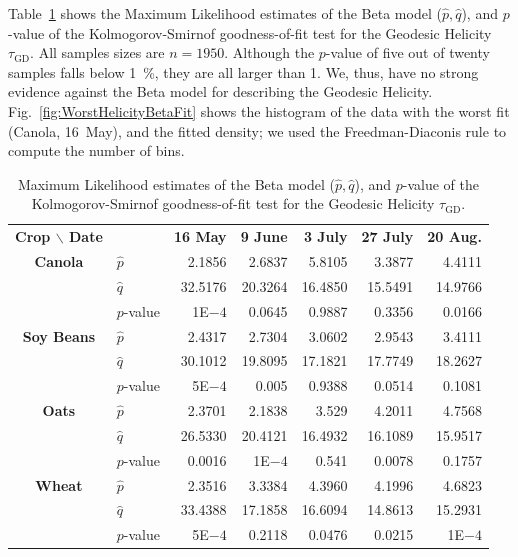 \documentclass[journal]{IEEEtran}
\begin{document}
Table~\ref{tab:params_helicity} shows the Maximum Likelihood estimates of the Beta model ($\widehat p,\widehat q$), and $p$-value of the Kolmogorov-Smirnof goodness-of-fit test for the Geodesic Helicity $\tau_{\text{GD}}$.
All samples sizes are $n=1950$.
Although the $p$-value of five out of twenty samples falls below \SI{1}{\percent}, they are all larger than \SI{1}{\pertenmille}.
We, thus, have no strong evidence against the Beta model for describing the Geodesic Helicity.
Fig.~\ref{fig:WorstHelicityBetaFit} shows the histogram of the data with the worst fit (Canola, 16~May), and the fitted density; we used the Freedman-Diaconis rule to compute the number of bins.

\begin{table}[hbt]
	\centering
	\caption{Maximum Likelihood estimates of the Beta model ($\widehat p,\widehat q$), and $p$-value of the Kolmogorov-Smirnof goodness-of-fit test for the Geodesic Helicity $\tau_{\text{GD}}$.}
	\label{tab:params_helicity}
	\setlength{\tabcolsep}{3.8pt}
	\begin{tabular}{clrrrrr}
		\toprule
		\textbf{Crop $\backslash$ Date} & & \textbf{16 May} & \textbf{9 June} & \textbf{3 July} & \textbf{27 July} & \textbf{20 Aug.}\\ \cmidrule(lr){1-2} \cmidrule(lr){3-3} \cmidrule(lr){4-4} \cmidrule(lr){5-5} \cmidrule(lr){6-6} \cmidrule(lr){7-7}
		\textbf{Canola} 	
		& $\widehat{p}$ & 2.1856  	& 2.6837    & 5.8105 	& 3.3877  	& 4.4111 \\
		& $\widehat{q}$ & 32.5176 	& 20.3264 	& 16.4850 	& 15.5491 	& 14.9766\\ 
		& $p$-value 	& 1E$-4$ 		& 0.0645 	& 0.9887 	& 0.3356 	& 0.0166\\		
		\midrule
		\textbf{Soy Beans}
		& $\widehat{p}$ & 2.4317   	& 2.7304   	& 3.0602   	& 2.9543   	& 3.4111 \\
		& $\widehat{q}$ & 30.1012   & 19.8095   & 17.1821   & 17.7749   & 18.2627 \\ 
		& $p$-value 	& 5E$-4$ 	& 0.005 	& 0.9388 	& 0.0514 	& 0.1081\\			
		\midrule
		\textbf{Oats}
		& $\widehat{p}$ & 2.3701   	& 2.1838  	& 3.529     & 4.2011 	& 4.7568 \\
		& $\widehat{q}$ & 26.5330 	& 20.4121   & 16.4932 	& 16.1089  	& 15.9517 \\ 
		& $p$-value 	& 0.0016 	& 1E$-4$ 	& 0.541 	& 0.0078	& 0.1757 \\
		\midrule
		\textbf{Wheat} 
		& $\widehat{p}$ & 2.3516   	& 3.3384  	& 4.3960  	& 4.1996  	& 4.6823   \\
		& $\widehat{q}$ & 33.4388   & 17.1858   & 16.6094   & 14.8613   & 15.2931   \\
		& $p$-value 	& 5E$-4$ 	& 0.2118 	& 0.0476 	& 0.0215 	& 1E$-4$\\	
		\bottomrule
	\end{tabular}
\end{table}
\end{document}
